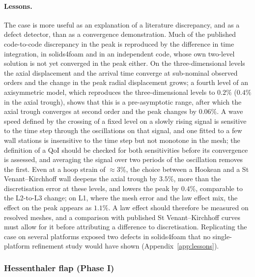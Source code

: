 \paragraph{Lessons.}
The case is more useful as an explanation of a literature discrepancy, and as a defect detector, than as a convergence demonstration.
Much of the published code-to-code discrepancy in the peak is reproduced by the difference in time integration, in solids4foam and in an independent code, whose own two-level solution is not yet converged in the peak either.
On the three-dimensional levels the axial displacement and the arrival time converge at sub-nominal observed orders and the change in the peak radial displacement grows; a fourth level of an axisymmetric model, which reproduces the three-dimensional levels to $0.2\%$ ($0.4\%$ in the axial trough), shows that this is a pre-asymptotic range, after which the axial trough converges at second order and the peak changes by $0.06\%$.
A wave speed defined by the crossing of a fixed level on a slowly rising signal is sensitive to the time step through the oscillations on that signal, and one fitted to a few wall stations is insensitive to the time step but not monotone in the mesh; the definition of a QoI should be checked for both sensitivities before its convergence is assessed, and averaging the signal over two periods of the oscillation removes the first.
Even at a hoop strain of $\approx3\%$, the choice between a Hookean and a St Venant--Kirchhoff wall deepens the axial trough by $3.5\%$, more than the discretisation error at these levels, and lowers the peak by $0.4\%$, comparable to the L2-to-L3 change; on L1, where the mesh error and the law effect mix, the effect on the peak appears as $1.1\%$. A law effect should therefore be measured on resolved meshes, and a comparison with published St Venant--Kirchhoff curves must allow for it before attributing a difference to discretisation.
Replicating the case on several platforms exposed two defects in solids4foam that no single-platform refinement study would have shown (Appendix~\ref{app:lessons}).

\subsubsection{Hessenthaler flap (Phase I)}\label{sec:hessenthaler}

